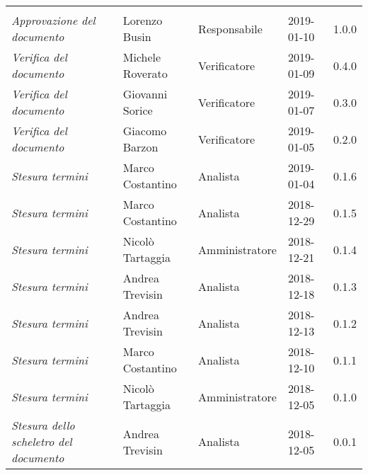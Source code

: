\newpage 
\section*{}
\begin{table}[H]
	\centering
	\begin{tabular}{p{4cm}|C{3cm}|C{3cm}|R{2.5cm}|R{2cm}}
		
		 & & & & \\
		
		
		\emph{Approvazione del documento} & Lorenzo Busin & Responsabile & 2019-01-10 & 1.0.0 \\
		\hline
		
		\emph{Verifica del documento} & Michele Roverato & Verificatore & 2019-01-09 & 0.4.0 \\
		\hline
		
		\emph{Verifica del documento} & Giovanni Sorice & Verificatore & 2019-01-07 & 0.3.0 \\
		\hline
		
		\emph{Verifica del documento} & Giacomo Barzon & Verificatore & 2019-01-05 & 0.2.0 \\
		\hline
		
		\emph{Stesura termini} & Marco Costantino & Analista & 2019-01-04 & 0.1.6 \\
		\hline
		
		\emph{Stesura termini} & Marco Costantino & Analista & 2018-12-29 & 0.1.5 \\
		\hline
		
		\emph{Stesura termini} & Nicolò Tartaggia & Amministratore & 2018-12-21 & 0.1.4 \\
		\hline
		
		\emph{Stesura termini} & Andrea Trevisin & Analista & 2018-12-18 & 0.1.3 \\
		\hline
		
		\emph{Stesura termini} & Andrea Trevisin & Analista & 2018-12-13 & 0.1.2 \\
		\hline
		
		\emph{Stesura termini} & Marco Costantino & Analista & 2018-12-10 & 0.1.1 \\
		\hline
		
		\emph{Stesura termini} & Nicolò Tartaggia & Amministratore & 2018-12-05 & 0.1.0 \\
		\hline
		
		\emph{Stesura dello scheletro del documento} & Andrea Trevisin & Analista & 2018-12-05 & 0.0.1 \\
		
	\end{tabular}
	
\end{table}


\clearpage
